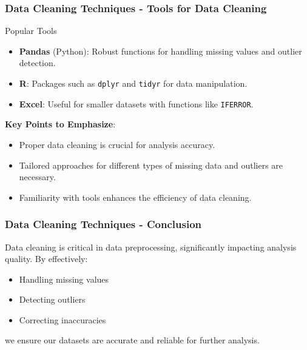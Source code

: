\documentclass[aspectratio=169]{beamer}
\begin{document}
\begin{frame}[fragile]
    \frametitle{Data Cleaning Techniques - Tools for Data Cleaning}
    \begin{block}{Popular Tools}
        \begin{itemize}
            \item \textbf{Pandas} (Python): Robust functions for handling missing values and outlier detection.
            \item \textbf{R}: Packages such as \texttt{dplyr} and \texttt{tidyr} for data manipulation.
            \item \textbf{Excel}: Useful for smaller datasets with functions like \texttt{IFERROR}.
        \end{itemize}
    \end{block}

    \textbf{Key Points to Emphasize}:
    \begin{itemize}
        \item Proper data cleaning is crucial for analysis accuracy.
        \item Tailored approaches for different types of missing data and outliers are necessary.
        \item Familiarity with tools enhances the efficiency of data cleaning.
    \end{itemize}
\end{frame}

\begin{frame}[fragile]
    \frametitle{Data Cleaning Techniques - Conclusion}
    Data cleaning is critical in data preprocessing, significantly impacting analysis quality. 
    By effectively:
    \begin{itemize}
        \item Handling missing values
        \item Detecting outliers
        \item Correcting inaccuracies
    \end{itemize}
    we ensure our datasets are accurate and reliable for further analysis.
\end{frame}
\end{document}
